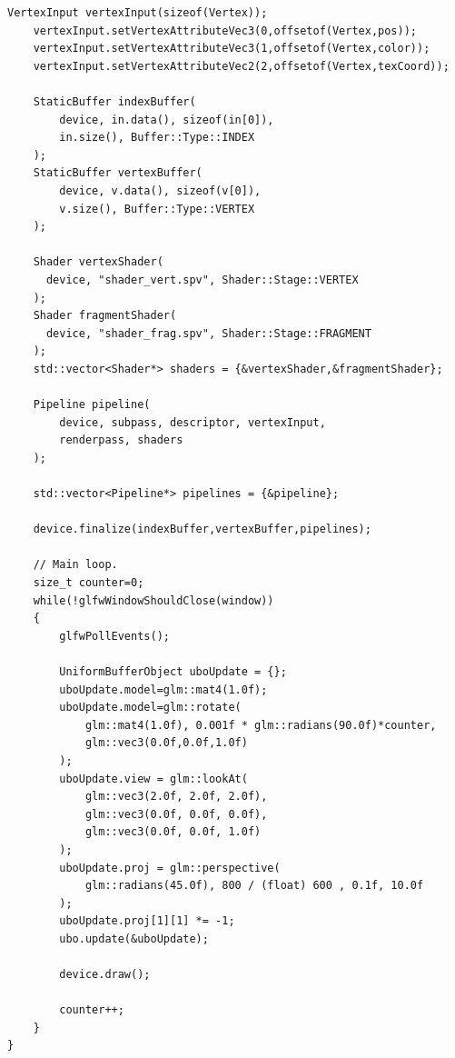 \documentclass[12pt]{report}
\theoremstyle{definition}
\begin{document}
\begin{lstlisting}[caption=OBJ drawing with evulkan library., showstringspaces=false]
    VertexInput vertexInput(sizeof(Vertex));
    vertexInput.setVertexAttributeVec3(0,offsetof(Vertex,pos));
    vertexInput.setVertexAttributeVec3(1,offsetof(Vertex,color));
    vertexInput.setVertexAttributeVec2(2,offsetof(Vertex,texCoord));

    StaticBuffer indexBuffer(
        device, in.data(), sizeof(in[0]),
        in.size(), Buffer::Type::INDEX
    );
    StaticBuffer vertexBuffer(
        device, v.data(), sizeof(v[0]),
        v.size(), Buffer::Type::VERTEX
    );

    Shader vertexShader(
      device, "shader_vert.spv", Shader::Stage::VERTEX
    );
    Shader fragmentShader(
      device, "shader_frag.spv", Shader::Stage::FRAGMENT
    );
    std::vector<Shader*> shaders = {&vertexShader,&fragmentShader};

    Pipeline pipeline(
        device, subpass, descriptor, vertexInput,
        renderpass, shaders
    );

    std::vector<Pipeline*> pipelines = {&pipeline};

    device.finalize(indexBuffer,vertexBuffer,pipelines);

    // Main loop.
    size_t counter=0;
    while(!glfwWindowShouldClose(window))
    {
        glfwPollEvents();

        UniformBufferObject uboUpdate = {};
        uboUpdate.model=glm::mat4(1.0f);
        uboUpdate.model=glm::rotate(
            glm::mat4(1.0f), 0.001f * glm::radians(90.0f)*counter,
            glm::vec3(0.0f,0.0f,1.0f)
        );
        uboUpdate.view = glm::lookAt(
            glm::vec3(2.0f, 2.0f, 2.0f),
            glm::vec3(0.0f, 0.0f, 0.0f),
            glm::vec3(0.0f, 0.0f, 1.0f)
        );
        uboUpdate.proj = glm::perspective(
            glm::radians(45.0f), 800 / (float) 600 , 0.1f, 10.0f
        );
        uboUpdate.proj[1][1] *= -1;
        ubo.update(&uboUpdate);

        device.draw();

        counter++;
    }
}
    \end{lstlisting}

    \clearpage
\end{document}
